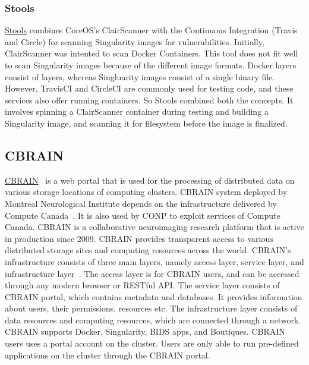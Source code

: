 \documentclass[a4paper,num-refs]{oup-contemporary}
\begin{document}
\subsubsection{Stools}

\href{https://github.com/singularityhub/stools}{Stools} combines CoreOS's ClairScanner with the Continuous Integration (Travis and
Circle) for scanning Singularity images for vulnerabilities.
Initially, ClairScanner was intented to scan Docker Containers. This tool does not fit well
to scan Singularity images because of the different image formats. Docker layers
consist of layers, whereas Singluarity images consist of a single binary file.
However, TravisCI and CircleCI are commonly used for testing code, and these
services also offer running containers. So Stools combined both the concepts.
It involves spinning a ClairScanner container during testing and building a
Singularity image, and scanning it for filesystem before the image is finalized.

\subsection{CBRAIN}

\href{http://github.com/aces/cbrain}{CBRAIN}~\cite{sherif2014cbrain} is a web portal that is
used for the processing of distributed data on various storage locations of computing
clusters. CBRAIN system deployed by Montreal Neurological Institute depends on the infrastructure
delivered by Compute Canada~\cite{das2016mni}.
It is also used by CONP to exploit services of Compute Canada. CBRAIN is a collaborative
neuroimaging research platform that is active in production since 2009. CBRAIN
provides transparent access to various distributed storage sites and computing
resources across the world. CBRAIN’s infrastructure consists of three main
layers, namely access layer, service layer, and infrastructure layer~\cite{sherif2014cbrain}. The access
layer is for CBRAIN users, and can be accessed through any modern browser or
RESTful API. The service layer consists of CBRAIN portal, which contains
metadata and databases. It provides information about users, their permissions,
resources etc. The infrastructure layer consists of data resources and computing
resources, which are connected through a network. 
CBRAIN supports Docker, Singularity, BIDS apps, and Boutiques.
CBRAIN users uses a portal
account on the cluster. Users are only able to
run pre-defined applications on the cluster through the CBRAIN portal.
\end{document}
